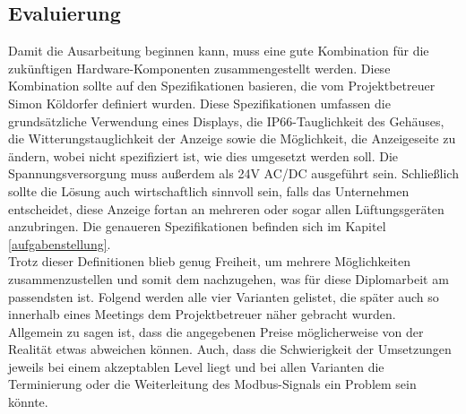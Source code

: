 \subsection{Evaluierung} \label{evaluierung}
Damit die Ausarbeitung beginnen kann, muss eine gute Kombination für die zukünftigen Hardware-Komponenten zusammengestellt werden. Diese Kombination sollte auf den Spezifikationen basieren, die vom Projektbetreuer Simon Köldorfer definiert wurden. Diese Spezifikationen umfassen die grundsätzliche Verwendung eines Displays, die IP66-Tauglichkeit des Gehäuses, die Witterungstauglichkeit der Anzeige sowie die Möglichkeit, die Anzeigeseite zu ändern, wobei nicht spezifiziert ist, wie dies umgesetzt werden soll. Die Spannungsversorgung muss außerdem als 24V AC/DC ausgeführt sein. Schließlich sollte die Lösung auch wirtschaftlich sinnvoll sein, falls das Unternehmen entscheidet, diese Anzeige fortan an mehreren oder sogar allen Lüftungsgeräten anzubringen. Die genaueren Spezifikationen befinden sich im Kapitel \ref{aufgabenstellung}.\\
Trotz dieser Definitionen blieb genug Freiheit, um mehrere Möglichkeiten zusammenzustellen und somit dem nachzugehen, was für diese Diplomarbeit am passendsten ist. 
Folgend werden alle vier Varianten gelistet, die später auch so innerhalb eines Meetings dem Projektbetreuer näher gebracht wurden. \\
Allgemein zu sagen ist, dass die angegebenen Preise möglicherweise von der Realität etwas abweichen können. Auch, dass die Schwierigkeit der Umsetzungen jeweils bei einem akzeptablen Level liegt und bei allen Varianten die Terminierung oder die Weiterleitung des Modbus-Signals ein Problem sein könnte.
